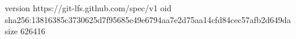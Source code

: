 version https://git-lfs.github.com/spec/v1
oid sha256:13816385c3730625d7f95685e49e6794aa7e2d75aa14cfd84cec57afb2d649da
size 626416
